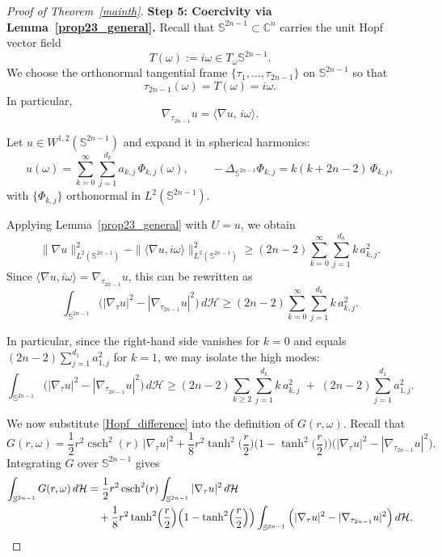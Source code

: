 \documentclass[10pt,a4paper]{amsart}
\newcommand{\csch}{\operatorname{csch}}
\def\ge{\geqslant}
\begin{document}
\begin{proof}[Proof of Theorem~\ref{mainth}]
\medskip
\noindent\textbf{Step 5: Coercivity via Lemma~\ref{prop23_general}.}
Recall that $\mathbb S^{2n-1}\subset\mathbb C^n$ carries the unit Hopf vector field
\[
T(\omega):= i\omega\in T_\omega\mathbb S^{2n-1}.
\]
We choose the orthonormal tangential frame $\{\tau_1,\dots,\tau_{2n-1}\}$ on $\mathbb S^{2n-1}$
so that
\[
\tau_{2n-1}(\omega)=T(\omega)=i\omega.
\]
In particular,
\[
\nabla_{\tau_{2n-1}}u = \langle \nabla u,\, i\omega\rangle.
\]

\smallskip
Let $u\in W^{1,2}(\mathbb S^{2n-1})$ and expand it in spherical harmonics:
\[
u(\omega)=\sum_{k=0}^\infty\sum_{j=1}^{d_k} a_{k,j}\,\Phi_{k,j}(\omega),
\qquad
-\Delta_{\mathbb S^{2n-1}}\Phi_{k,j}=k(k+2n-2)\,\Phi_{k,j},
\]
with $\{\Phi_{k,j}\}$ orthonormal in $L^2(\mathbb S^{2n-1})$.

\smallskip
Applying Lemma~\ref{prop23_general} with $U=u$, we obtain
\begin{equation}\label{coercivity_hopf}
\|\nabla u\|_{L^2(\mathbb S^{2n-1})}^2
-\|\langle\nabla u,i\omega\rangle\|_{L^2(\mathbb S^{2n-1})}^2
\ge (2n-2)\sum_{k=0}^\infty\sum_{j=1}^{d_k} k\,a_{k,j}^2.
\end{equation}
Since $\langle\nabla u,i\omega\rangle=\nabla_{\tau_{2n-1}}u$, this can be rewritten as
\begin{equation}\label{Hopf_difference}
\int_{\mathbb S^{2n-1}}
\Big(|\nabla_\tau u|^2-|\nabla_{\tau_{2n-1}}u|^2\Big)\,d\mathcal H
\ge (2n-2)\sum_{k=0}^\infty\sum_{j=1}^{d_k} k\,a_{k,j}^2.
\end{equation}

\smallskip
In particular, since the right-hand side vanishes for $k=0$ and equals $(2n-2)\sum_{j=1}^{d_1}a_{1,j}^2$
for $k=1$, we may isolate the high modes:
\begin{equation}\label{Hopf_high_modes}
\int_{\mathbb S^{2n-1}}
\Big(|\nabla_\tau u|^2-|\nabla_{\tau_{2n-1}}u|^2\Big)\,d\mathcal H
\ge (2n-2)\sum_{k\ge 2}\sum_{j=1}^{d_k} k\,a_{k,j}^2
\;+\;(2n-2)\sum_{j=1}^{d_1}a_{1,j}^2.
\end{equation}

\smallskip
We now substitute \eqref{Hopf_difference} into the definition of $G(r,\omega)$.
Recall that
\[
G(r,\omega)
=\frac12 r^2\csch^2(r)\,|\nabla_\tau u|^2
+\frac18 r^2 \tanh^2\!\Big(\frac r2\Big)\Big(1-\tanh^2\!\Big(\frac r2\Big)\Big)
\Big(|\nabla_\tau u|^2-|\nabla_{\tau_{2n-1}}u|^2\Big).
\]
Integrating $G$ over $\mathbb S^{2n-1}$ gives
\begin{align}
\int_{\mathbb S^{2n-1}}G(r,\omega)\,d\mathcal H
&=
\frac12 r^2\csch^2(r)\int_{\mathbb S^{2n-1}}|\nabla_\tau u|^2\,d\mathcal H
\notag\\
&\quad
+\frac18 r^2 \tanh^2\!\Big(\frac r2\Big)\Big(1-\tanh^2\!\Big(\frac r2\Big)\Big)
\int_{\mathbb S^{2n-1}}
\Big(|\nabla_\tau u|^2-|\nabla_{\tau_{2n-1}}u|^2\Big)\,d\mathcal H.
\label{intG_split}
\end{align}


\end{proof}
\end{document}
